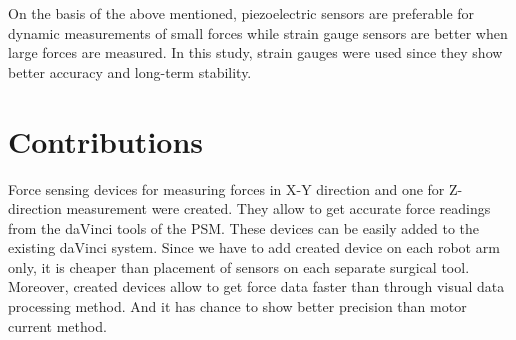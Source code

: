 On the basis of the above mentioned, piezoelectric sensors are preferable for dynamic measurements of small forces while strain gauge sensors are better when large forces are measured. In this study, strain gauges were used since they show better accuracy and long-term stability. \cite{SGandP1,SGandP2}

\section{Contributions}
\label{sec:MyAppr}
Force sensing devices for measuring forces in X-Y direction and one for Z-direction measurement were created. They allow to get accurate force readings from the daVinci tools of the PSM.  These devices can be easily added to the existing daVinci system. Since we have to add created device on each robot arm only, it is cheaper than placement of sensors on each separate surgical tool.  Moreover, created devices allow to get force data faster than through visual data processing method. And it has chance to show better precision than motor current method.
